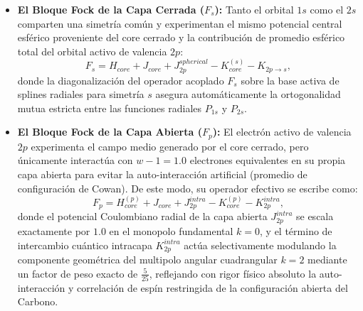 \begin{itemize}
\item \textbf{El Bloque Fock de la Capa Cerrada (\(F_s\)):}
  Tanto el orbital \( 1s \) como el \( 2s \) comparten una simetría común y experimentan el mismo potencial central esférico proveniente del core cerrado y la contribución de promedio esférico total del orbital activo de valencia \( 2p \):
  \begin{equation}
    F_s = H_{core} + J_{core} + J_{2p}^{spherical} - K_{core}^{(s)} - K_{2p\to s},
  \end{equation}
  donde la diagonalización del operador acoplado \( F_s \) sobre la base activa de splines radiales para simetría \( s \) asegura automáticamente la ortogonalidad mutua estricta entre las funciones radiales \( P_{1s} \) y \( P_{2s} \).
  
\item \textbf{El Bloque Fock de la Capa Abierta (\(F_p\)):}
  El electrón activo de valencia \( 2p \) experimenta el campo medio generado por el core cerrado, pero únicamente interactúa con \( w-1 = 1.0 \) electrones equivalentes en su propia capa abierta para evitar la auto-interacción artificial (promedio de configuración de Cowan). De este modo, su operador efectivo se escribe como:
  \begin{equation}
    F_p = H_{core}^{(p)} + J_{core} + J_{2p}^{intra} - K_{core}^{(p)} - K_{2p}^{intra},
  \end{equation}
  donde el potencial Coulombiano radial de la capa abierta \( J_{2p}^{intra} \) se escala exactamente por \( 1.0 \) en el monopolo fundamental \( k=0 \), y el término de intercambio cuántico intracapa \( K_{2p}^{intra} \) actúa selectivamente modulando la componente geométrica del multipolo angular cuadrangular \( k=2 \) mediante un factor de peso exacto de \( \frac{5}{25} \), reflejando con rigor físico absoluto la auto-interacción y correlación de espín restringida de la configuración abierta del Carbono.
\end{itemize}

